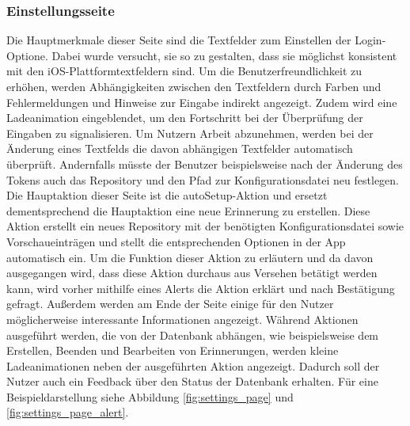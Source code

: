 \subsubsection{Einstellungsseite}%
Die Hauptmerkmale dieser Seite sind die Textfelder zum Einstellen der Login-Optione. %
	Dabei wurde versucht, sie so zu gestalten, dass sie möglichst konsistent mit den iOS-Plattformtextfeldern sind.\newline%
Um die Benutzerfreundlichkeit zu erhöhen, werden Abhängigkeiten zwischen den Textfeldern durch Farben und Fehlermeldungen und Hinweise zur Eingabe indirekt angezeigt. Zudem wird eine Ladeanimation eingeblendet, um den Fortschritt bei der Überprüfung der Eingaben zu signalisieren.
Um Nutzern Arbeit abzunehmen, werden bei der Änderung eines Textfelds die davon abhängigen Textfelder automatisch überprüft. Andernfalls müsste der Benutzer beispielsweise nach der Änderung des Tokens auch das Repository und den Pfad zur Konfigurationsdatei neu festlegen.\newline%
Die Hauptaktion dieser Seite ist die \glqq autoSetup-Aktion\grqq{} und ersetzt dementsprechend die Hauptaktion eine neue Erinnerung zu erstellen. Diese Aktion erstellt ein neues Repository mit der benötigten Konfigurationsdatei sowie Vorschaueinträgen und stellt die entsprechenden Optionen in der App automatisch ein. Um die Funktion dieser Aktion zu erläutern und da davon ausgegangen wird, dass diese Aktion durchaus aus Versehen betätigt werden kann, wird vorher mithilfe eines \glqq Alerts\grqq{} die Aktion erklärt und nach Bestätigung gefragt.\newline%
Außerdem werden am Ende der Seite einige für den Nutzer möglicherweise interessante Informationen angezeigt.\newline%
Während Aktionen ausgeführt werden, die von der Datenbank abhängen, wie beispielsweise dem Erstellen, Beenden und Bearbeiten von Erinnerungen, werden kleine Ladeanimationen neben der ausgeführten Aktion angezeigt. Dadurch soll der Nutzer auch ein Feedback über den Status der Datenbank erhalten. 
\newline%
Für eine Beispieldarstellung siehe Abbildung \ref{fig:settings_page} und \ref{fig:settings_page_alert}.

